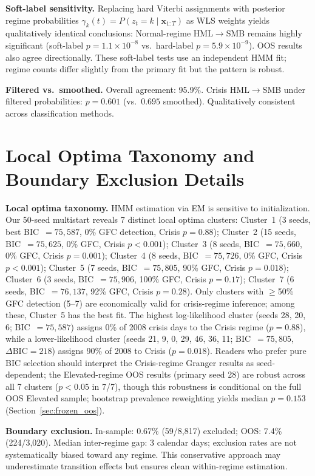\documentclass[sigconf,anonymous]{acmart}
\begin{document}
\textbf{Soft-label sensitivity.}
Replacing hard Viterbi assignments with posterior regime probabilities
$\gamma_k(t) = P(z_t = k \mid \mathbf{x}_{1:T})$ as WLS weights yields
qualitatively identical conclusions: Normal-regime HML$\to$SMB remains
highly significant (soft-label $p = 1.1 \times 10^{-8}$ vs.\ hard-label
$p = 5.9 \times 10^{-9}$). OOS results also agree directionally.
These soft-label tests use an independent HMM fit; regime counts differ
slightly from the primary fit but the pattern is robust.

\textbf{Filtered vs.\ smoothed.} Overall agreement: 95.9\%.
Crisis HML$\to$SMB under filtered probabilities: $p = 0.601$ (vs.\ $0.695$ smoothed).
Qualitatively consistent across classification methods.

\section{Local Optima Taxonomy and Boundary Exclusion Details}
\label{app:optima}

\textbf{Local optima taxonomy.}
HMM estimation via EM is sensitive to initialization. Our 50-seed multistart
reveals 7 distinct local optima clusters:
Cluster~1 (3 seeds, best BIC~$= 75{,}587$, 0\% GFC detection, Crisis $p = 0.88$);
Cluster~2 (15 seeds, BIC~$= 75{,}625$, 0\% GFC, Crisis $p < 0.001$);
Cluster~3 (8 seeds, BIC~$= 75{,}660$, 0\% GFC, Crisis $p = 0.001$);
Cluster~4 (8 seeds, BIC~$= 75{,}726$, 0\% GFC, Crisis $p < 0.001$);
Cluster~5 (7 seeds, BIC~$= 75{,}805$, 90\% GFC, Crisis $p = 0.018$);
Cluster~6 (3 seeds, BIC~$= 75{,}906$, 100\% GFC, Crisis $p = 0.17$);
Cluster~7 (6 seeds, BIC~$= 76{,}137$, 92\% GFC, Crisis $p = 0.28$).
Only clusters with $\geq$50\% GFC detection (5--7) are economically valid for
crisis-regime inference; among these, Cluster~5 has the best fit.
The highest log-likelihood cluster (seeds 28, 20, 6; BIC~$= 75{,}587$)
assigns 0\% of 2008 crisis days to the Crisis regime ($p = 0.88$),
while a lower-likelihood cluster (seeds 21, 9, 0, 29, 46, 36, 11;
BIC~$= 75{,}805$, $\Delta\text{BIC} = 218$) assigns 90\% of 2008 to Crisis
($p = 0.018$). Readers who prefer pure BIC selection should interpret the
Crisis-regime Granger results as seed-dependent; the Elevated-regime OOS results
(primary seed 28) are robust across all 7 clusters ($p < 0.05$ in 7/7),
though this robustness is conditional on the full OOS Elevated sample;
bootstrap prevalence reweighting yields median $p = 0.153$
(Section~\ref{sec:frozen_oos}).

\textbf{Boundary exclusion.}
In-sample: 0.67\% (59/8,817) excluded; OOS: 7.4\% (224/3,020).
Median inter-regime gap: 3 calendar days; exclusion rates are not
systematically biased toward any regime. This conservative approach
may underestimate transition effects but ensures clean within-regime estimation.


\end{document}
